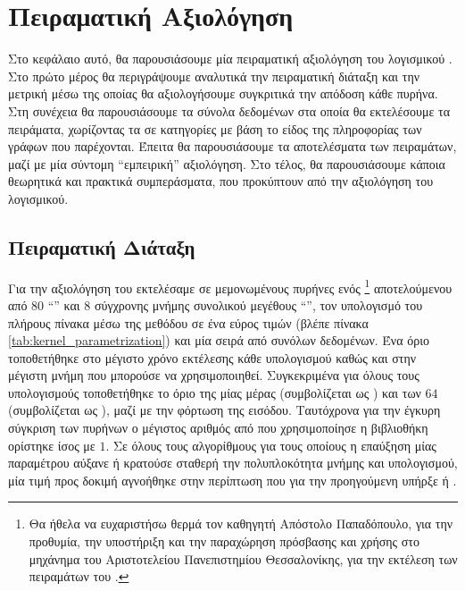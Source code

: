 \chapter{Πειραματική Αξιολόγηση}
\label{chap4}
Στο κεφάλαιο αυτό, θα παρουσιάσουμε μία πειραματική αξιολόγηση του λογισμικού .
Στο πρώτο μέρος θα περιγράψουμε αναλυτικά την πειραματική διάταξη και την μετρική μέσω της οποίας θα αξιολογήσουμε συγκριτικά την απόδοση κάθε πυρήνα.
Στη συνέχεια θα παρουσιάσουμε τα σύνολα δεδομένων στα οποία θα εκτελέσουμε τα πειράματα, χωρίζοντας τα σε κατηγορίες με βάση το είδος της πληροφορίας των γράφων που παρέχονται.
Έπειτα θα παρουσιάσουμε τα αποτελέσματα των πειραμάτων, μαζί με μία σύντομη ``εμπειρική'' αξιολόγηση.
Στο τέλος, θα παρουσιάσουμε κάποια θεωρητικά και πρακτικά συμπεράσματα, που προκύπτουν από την αξιολόγηση του λογισμικού.
\section{Πειραματική Διάταξη}
\label{sec:es}
Για την αξιολόγηση του  εκτελέσαμε σε μεμονωμένους πυρήνες ενός \footnote{Θα ήθελα να ευχαριστήσω θερμά τον καθηγητή Απόστολο Παπαδόπουλο, για την προθυμία, την υποστήριξη και την παραχώρηση πρόσβασης και χρήσης στο μηχάνημα  του Αριστοτελείου Πανεπιστημίου Θεσσαλονίκης, για την εκτέλεση των πειραμάτων του .} αποτελούμενου από 80 ``'' και 8  σύγχρονης μνήμης  συνολικού μεγέθους ``'', τον υπολογισμό του πλήρους  πίνακα μέσω της μεθόδου  σε ένα εύρος τιμών (βλέπε πίνακα \ref{tab:kernel_parametrization}) και μία σειρά από συνόλων δεδομένων.
Ένα όριο τοποθετήθηκε στο μέγιστο χρόνο εκτέλεσης κάθε υπολογισμού καθώς και στην μέγιστη μνήμη  που μπορούσε να χρησιμοποιηθεί. 
Συγκεκριμένα για όλους τους υπολογισμούς τοποθετήθηκε το όριο της μίας μέρας (συμβολίζεται ως ) και των $64$ (συμβολίζεται ως ), μαζί με την φόρτωση της εισόδου.
Ταυτόχρονα για την έγκυρη σύγκριση των πυρήνων ο μέγιστος αριθμός από  που χρησιμοποίησε η βιβλιοθήκη  ορίστηκε ίσος με $1$.
Σε όλους τους αλγορίθμους για τους οποίους η επαύξηση μίας παραμέτρου αύξανε ή κρατούσε σταθερή την πολυπλοκότητα μνήμης και υπολογισμού, μία τιμή προς δοκιμή αγνοήθηκε στην περίπτωση που για την προηγούμενη υπήρξε  ή .
